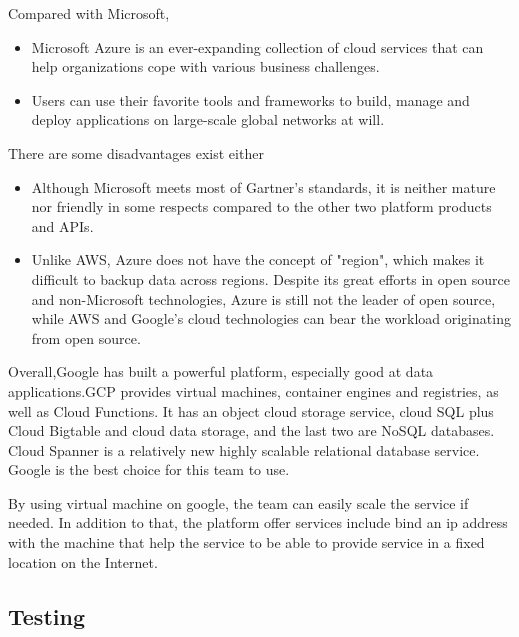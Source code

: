 \documentclass{article}
\begin{document}
Compared with Microsoft, 
\begin{itemize}
    \item Microsoft Azure is an ever-expanding collection of cloud services that can help organizations cope with various business challenges. 
    \item Users can use their favorite tools and frameworks to build, manage and deploy applications on large-scale global networks at will.
\end{itemize}
There are some disadvantages exist either
\begin{itemize} 
    \item Although Microsoft meets most of Gartner's standards, it is neither mature nor friendly in some respects compared to the other two platform products and APIs.
    \item Unlike AWS, Azure does not have the concept of "region", which makes it difficult to backup data across regions. Despite its great efforts in open source and non-Microsoft technologies, Azure is still not the leader of open source, while AWS and Google's cloud technologies can bear the workload originating from open source.\cite{c9}
   
\end{itemize}

Overall,Google has built a powerful platform, especially good at data applications.GCP provides virtual machines, container engines and registries, as well as Cloud Functions. It has an object cloud storage service, cloud SQL plus Cloud Bigtable and cloud data storage, and the last two are NoSQL databases. Cloud Spanner is a relatively new highly scalable relational database service. Google is the best choice for this team to use.

By using virtual machine on google, the team can easily scale the service if needed. In addition to that, the platform offer services include bind an ip address with the machine that help the service to be able to provide service in a fixed location on the Internet.

\subsection {Testing}
\end{document}
